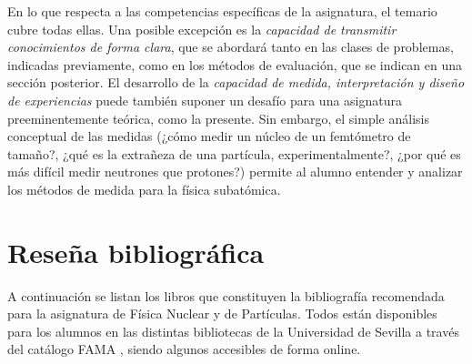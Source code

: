 \documentclass[a4paper,12pt,twoside]{article}
\begin{document}
En lo que respecta a las competencias específicas de la asignatura, el temario cubre todas ellas. Una posible excepción es la \textit{capacidad de transmitir conocimientos de forma clara}, que se abordará tanto en las clases de problemas, indicadas previamente, como en los métodos de evaluación, que se indican en una sección posterior. El desarrollo de la \textit{capacidad de medida, interpretación y diseño de experiencias} puede también suponer un desafío para una asignatura preeminentemente teórica, como la presente. Sin embargo, el simple análisis conceptual de las medidas (¿cómo medir un núcleo de un femtómetro de tamaño?, ¿qué es la extrañeza de una partícula, experimentalmente?, ¿por qué es más difícil medir neutrones que protones?) permite al alumno entender y analizar los métodos de medida para la física subatómica.

\section{Reseña bibliográfica}
A continuación se listan los libros que constituyen la bibliografía recomendada para la asignatura de Física Nuclear y de Partículas. Todos están disponibles para los alumnos en las distintas bibliotecas de la Universidad de Sevilla a través del catálogo FAMA \cite{fama}, siendo algunos accesibles de forma online. 
\end{document}
